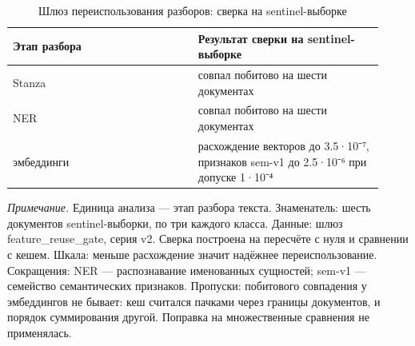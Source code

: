 \begin{table}[htbp]
\centering
\small
\caption{Шлюз переиспользования разборов: сверка на sentinel-выборке}
\label{tab:s13}
\begin{tabular}{>{\raggedright\arraybackslash}p{0.460\linewidth}>{\raggedright\arraybackslash}p{0.460\linewidth}}
\toprule
Этап разбора & Результат сверки на sentinel-выборке \\
\midrule
Stanza & совпал побитово на шести документах \\
NER & совпал побитово на шести документах \\
эмбеддинги & расхождение векторов до 3.5·10⁻⁷, признаков sem-v1 до 2.5·10⁻⁶ при допуске 1·10⁻⁴ \\
\bottomrule
\end{tabular}
\begin{minipage}{\linewidth}\footnotesize\vspace{2pt}
\textit{Примечание.} Единица анализа — этап разбора текста. Знаменатель: шесть документов sentinel-выборки, по три каждого класса. Данные: шлюз feature\_reuse\_gate, серия v2. Сверка построена на пересчёте с нуля и сравнении с кешем. Шкала: меньше расхождение значит надёжнее переиспользование. Сокращения: NER — распознавание именованных сущностей; sem-v1 — семейство семантических признаков. Пропуски: побитового совпадения у эмбеддингов не бывает: кеш считался пачками через границы документов, и порядок суммирования другой. Поправка на множественные сравнения не применялась.
\end{minipage}
\end{table}
